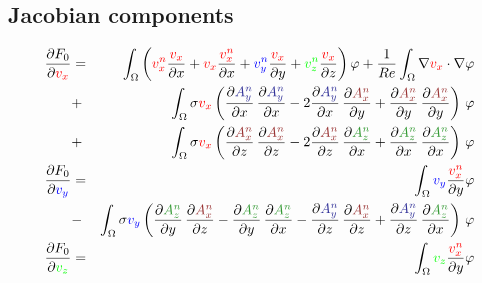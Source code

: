 \documentclass[smallextended]{svjour3}       %
\begin{document}
		\subsection{Jacobian components}
		\begin{eqnarray}
		\frac{\partial F_0}{\partial \textcolor{red}{v_x}} & = &
		\int_{\Omega} \left(\textcolor{red}{v_x^n} \frac{\textcolor{red}{v_x}}{\partial x} + \textcolor{red}{v_x} \frac{\textcolor{red}{v_x^n}}{\partial x} + \textcolor{blu}{v_y^n} \frac{\textcolor{red}{v_x}}{\partial y} + \textcolor{gre}{v_z^n} \frac{\textcolor{red}{v_x}}{\partial z}\right) \varphi
			+ \frac{1}{Re} \int_{\Omega} \nabla \textcolor{red}{v_x} \cdot \nabla \varphi \nonumber \\
			& + & \int_{\Omega} \sigma \textcolor{red}{v_x} \left(\frac{\partial \textcolor{darkblu}{A_y^n}}{\partial x}\,\frac{\partial \textcolor{darkblu}{A_y^n}}{\partial x} - 2 \frac{\partial \textcolor{darkblu}{A_y^n}}{\partial x}\,\frac{\partial \textcolor{darkred}{A_x^n}}{\partial y} + \frac{\partial \textcolor{darkred}{A_x^n}}{\partial y}\,\frac{\partial \textcolor{darkred}{A_x^n}}{\partial y} \right)\, \varphi \nonumber \\				
			& + & \int_{\Omega} \sigma \textcolor{red}{v_x} \left(\frac{\partial \textcolor{darkred}{A_x^n}}{\partial z}\,\frac{\partial \textcolor{darkred}{A_x^n}}{\partial z} - 2 \frac{\partial \textcolor{darkred}{A_x^n}}{\partial z}\,\frac{\partial \textcolor{darkgre}{A_z^n}}{\partial x} + \frac{\partial \textcolor{darkgre}{A_z^n}}{\partial x}\,\frac{\partial \textcolor{darkgre}{A_z^n}}{\partial x} \right)\, \varphi \\
			\frac{\partial F_0}{\partial \textcolor{blu}{v_y}} & = &
		\int_{\Omega} \textcolor{blu}{v_y} \frac{\textcolor{red}{v_x^n}}{\partial y} \varphi \nonumber  \\		
			& - & \int_{\Omega} \sigma \textcolor{blu}{v_y} \left(\frac{\partial \textcolor{darkgre}{A_z^n}}{\partial y}\,\frac{\partial \textcolor{darkred}{A_x^n}}{\partial z} - \frac{\partial \textcolor{darkgre}{A_z^n}}{\partial y}\,\frac{\partial \textcolor{darkgre}{A_z^n}}{\partial x} - \frac{\partial \textcolor{darkblu}{A_y^n}}{\partial z}\,\frac{\partial \textcolor{darkred}{A_x^n}}{\partial z}  + \frac{\partial \textcolor{darkblu}{A_y^n}}{\partial z}\,\frac{\partial \textcolor{darkgre}{A_z^n}}{\partial x} \right)\, \varphi \\			
			\frac{\partial F_0}{\partial \textcolor{gre}{v_z}} & = &
		\int_{\Omega} \textcolor{gre}{v_z} \frac{\textcolor{red}{v_x^n}}{\partial y} \varphi
			\nonumber \\

\end{eqnarray}
\end{document}
